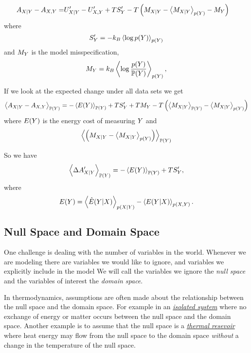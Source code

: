\documentclass[]{article}
\begin{document}
\begin{align*}
A_{X|Y} - A_{X,Y} =  & U^\prime_{X|Y} - U^\prime_{X,Y} + TS^\prime_Y - T\left(M_{X|Y} - \left\langle M_{X|Y} \right\rangle_{p(Y)} - M_{Y}\right)
\end{align*} 
where 
\[
S^\prime_{Y}=-k_B\left\langle \log p(Y)  \right\rangle_{p(Y) }
\] and \(M_{Y}\) is the model misspecification, \[
M_{Y} = k_B \left\langle \log \frac{p( Y)}{\mathbb{P}(Y) } \right\rangle_{p(Y) },
\]

If we look at the expected change under all data sets we get \[
\left\langle A_{X|Y} - A_{X,Y} \right\rangle_{\mathbb{P}(Y)} = -\left\langle E(Y) \right\rangle_{\mathbb{P}(Y)} + TS^\prime_Y + TM_{Y}  - T\left(\left\langle M_{X|Y} \right\rangle_{\mathbb{P}(Y)} - \left\langle M_{X|Y} \right\rangle_{p(Y)}\right)
\] where \(E(Y)\) is the energy cost of measuring
\(Y\) and 
\[
\left\langle \left(M_{X|Y} - \left\langle M_{X|Y} \right\rangle_{p(Y)}\right) \right\rangle_{\mathbb{P}(Y)}
\]

So we have 
\[
\left\langle \Delta A^\prime_{X|Y} \right\rangle_{\mathbb{P}(Y)} = -\left\langle E(Y) \right\rangle_{\mathbb{P}(Y)} + TS^\prime_Y,
\] 
where 
\[
E(Y) = \left\langle \hat{E}(Y|X) \right\rangle_{p(X|Y)} - \left\langle E(Y|X) \right\rangle_{p(X,Y)}.
\]

\subsection{Null Space and Domain Space}

One challenge is dealing with the number of variables in the world.
Whenever we are modeling there are variables we would like to ignore,
and variables we explicitly include in the model We will call the
variables we ignore the \emph{null space} and the variables of interest
the \emph{domain space}.

In thermodynamics, assumptions are often made about the relationship
between the null space and the domain space. For example in an
\href{https://en.wikipedia.org/wiki/Isolated_system}{\emph{isolated
system}} where no exchange of energy or matter occurs between the null
space and the domain space. Another example is to assume that the null
space is a \href{https://en.wikipedia.org/wiki/Thermal_reservoir}{\emph{thermal
resevoir}} where heat energy may flow from the null space to the domain
space \emph{without} a change in the temperature of the null space.
\end{document}

